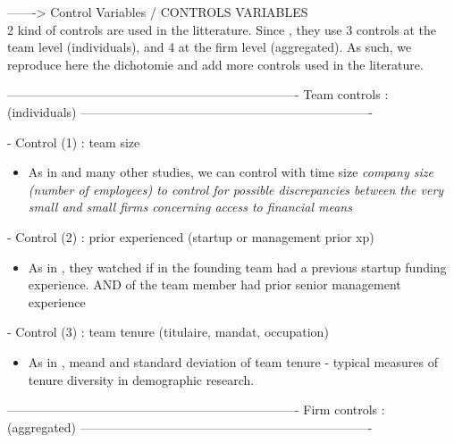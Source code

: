 \begin{itemize}
\begin{itemize}
-------> Control Variables / CONTROLS VARIABLES\\

2 kind of controls are used in the litterature. Since \citet{beckman2007early}, they use 3 controls at the team level (individuals), and 4 at the firm level (aggregated). As such, we reproduce here the dichotomie and add more controls used in the literature.

----------------------------------------------------------------------
Team controls : (individuals)
----------------------------------------------------------------------

- Control (1) : team size
\begin{itemize}
  \item As in \citep{de2010interrelationships} and many other studies, we can control with time size \textit{company size (number of employees) to control for possible discrepancies between the very small and small firms concerning access to financial means}
\end{itemize}

- Control (2) : prior experienced (startup or management prior xp)
\begin{itemize}
  \item As in \citet{beckman2007early}, they watched if in the founding team had a previous startup funding experience. AND of the team member had prior senior management experience
\end{itemize}

- Control (3) : team tenure (titulaire, mandat, occupation)
\begin{itemize}
  \item As in \citet{beckman2007early}, meand and standard deviation of team tenure - typical measures of tenure diversity in demographic research.
\end{itemize}

----------------------------------------------------------------------
Firm controls : (aggregated)
----------------------------------------------------------------------


\end{itemize}
\end{itemize}
